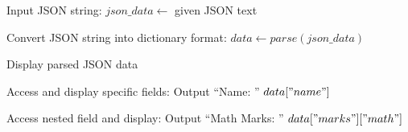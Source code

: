\begin{algorithm}
\caption{Parse JSON String and Access Values}
\begin{algorithmic}[1]

\STATE Input JSON string:
\STATE $json\_data \gets$ given JSON text

\STATE Convert JSON string into dictionary format:
\STATE $data \gets parse(json\_data)$

\STATE Display parsed JSON data

\STATE Access and display specific fields:
\STATE Output ``Name: '' $data["name"]$

\STATE Access nested field and display:
\STATE Output ``Math Marks: '' $data["marks"]["math"]$

\end{algorithmic}
\end{algorithm}